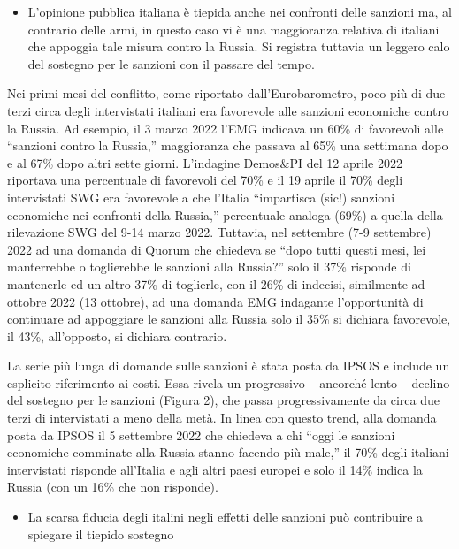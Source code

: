 \documentclass[
  openany]{book}
\providecommand{\tightlist}{%
  \setlength{\itemsep}{0pt}\setlength{\parskip}{0pt}}
\begin{document}
\begin{itemize}
\tightlist
\item
  L'opinione pubblica italiana è tiepida anche nei confronti delle sanzioni ma, al contrario delle armi, in questo caso vi è una maggioranza relativa di italiani che appoggia tale misura contro la Russia. Si registra tuttavia un leggero calo del sostegno per le sanzioni con il passare del tempo.
\end{itemize}

Nei primi mesi del conflitto, come riportato dall'Eurobarometro, poco più di due terzi circa degli intervistati italiani era favorevole alle sanzioni economiche contro la Russia. Ad esempio, il 3 marzo 2022 l'EMG indicava un 60\% di favorevoli alle ``sanzioni contro la Russia,'' maggioranza che passava al 65\% una settimana dopo e al 67\% dopo altri sette giorni. L'indagine Demos\&PI del 12 aprile 2022 riportava una percentuale di favorevoli del 70\% e il 19 aprile il 70\% degli intervistati SWG era favorevole a che l'Italia ``impartisca (sic!) sanzioni economiche nei confronti della Russia,'' percentuale analoga (69\%) a quella della rilevazione SWG del 9-14 marzo 2022. Tuttavia, nel settembre (7-9 settembre) 2022 ad una domanda di Quorum che chiedeva se ``dopo tutti questi mesi, lei manterrebbe o toglierebbe le sanzioni alla Russia?'' solo il 37\% risponde di mantenerle ed un altro 37\% di toglierle, con il 26\% di indecisi, similmente ad ottobre 2022 (13 ottobre), ad una domanda EMG indagante l'opportunità di continuare ad appoggiare le sanzioni alla Russia solo il 35\% si dichiara favorevole, il 43\%, all'opposto, si dichiara contrario.

La serie più lunga di domande sulle sanzioni è stata posta da IPSOS e include un esplicito riferimento ai costi. Essa rivela un progressivo -- ancorché lento -- declino del sostegno per le sanzioni (Figura 2), che passa progressivamente da circa due terzi di intervistati a meno della metà. In linea con questo trend, alla domanda posta da IPSOS il 5 settembre 2022 che chiedeva a chi ``oggi le sanzioni economiche comminate alla Russia stanno facendo più male,'' il 70\% degli italiani intervistati risponde all'Italia e agli altri paesi europei e solo il 14\% indica la Russia (con un 16\% che non risponde).

\begin{itemize}
\tightlist
\item
  La scarsa fiducia degli italini negli effetti delle sanzioni può contribuire a spiegare il tiepido sostegno
\end{itemize}
\end{document}
